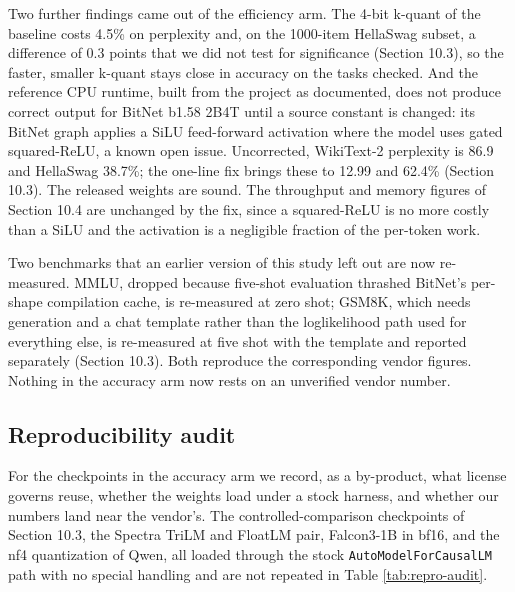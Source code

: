 \documentclass[11pt]{article}
\begin{document}
Two further findings came out of the efficiency arm. The 4-bit k-quant of the baseline
costs 4.5\% on perplexity and, on the 1000-item HellaSwag subset, a difference of 0.3
points that we did not test for significance (Section 10.3), so the faster, smaller
k-quant stays close in accuracy on the tasks checked. And the reference CPU runtime,
built from the project as documented, does not produce correct output for BitNet b1.58
2B4T until a source constant is changed: its BitNet graph applies a SiLU feed-forward
activation where the model uses gated squared-ReLU, a known open issue. Uncorrected,
WikiText-2 perplexity is 86.9 and HellaSwag 38.7\%; the one-line fix brings these to
12.99 and 62.4\% (Section 10.3). The released weights are sound. The throughput and
memory figures of Section 10.4 are unchanged by the fix, since a squared-ReLU is no more
costly than a SiLU and the activation is a negligible fraction of the per-token work.

Two benchmarks that an earlier version of this study left out are now re-measured. MMLU,
dropped because five-shot evaluation thrashed BitNet's per-shape compilation cache, is
re-measured at zero shot; GSM8K, which needs generation and a chat template rather than
the loglikelihood path used for everything else, is re-measured at five shot with the
template and reported separately (Section 10.3). Both reproduce the corresponding vendor
figures. Nothing in the accuracy arm now rests on an unverified vendor number.

\subsection{Reproducibility audit}

For the checkpoints in the accuracy arm we record, as a by-product, what license
governs reuse, whether the weights load under a stock harness, and whether our numbers
land near the vendor's. The controlled-comparison checkpoints of Section 10.3, the
Spectra TriLM and FloatLM pair, Falcon3-1B in bf16, and the nf4 quantization of Qwen,
all loaded through the stock \texttt{AutoModelForCausalLM} path with no special handling and are
not repeated in Table \ref{tab:repro-audit}.
\end{document}
